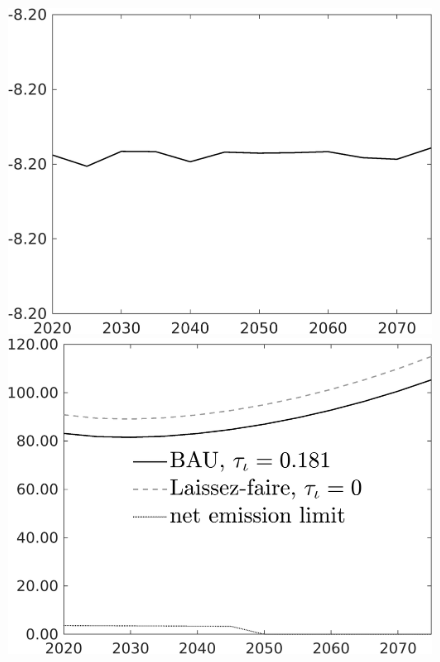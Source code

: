 \documentclass[12pt]{article}
\begin{document}
\begin{figure}[h!!]
\begin{minipage}[]{0.32\textwidth}
	\end{minipage}	
	\begin{minipage}[]{0.32\textwidth}
		\includegraphics[width=1\textwidth]{../../codding_model/own_basedOnFried/optimalPol_010922_revision/figures/all_13Sept22/CompTaul_Equlab_LFBAUPer_Reg0_C_spillover0_nsk1_xgr1_knspil0_sep1_countec0_GovRev0_etaa0.79.png}
	\end{minipage}	
	\begin{minipage}[]{0.32\textwidth}
		\includegraphics[width=1\textwidth]{../../codding_model/own_basedOnFried/optimalPol_010922_revision/figures/all_13Sept22/CompTaul_Equlab_LFBAU_Reg0_Emnet_spillover0_nsk1_xgr1_knspil0_sep1_countec0_GovRev0_etaa0.79_lgd1.png}

\end{minipage}
\end{figure}
\end{document}
